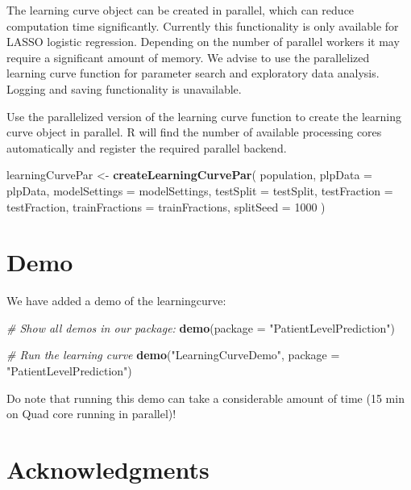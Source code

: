 \documentclass[]{article}
\newenvironment{Shaded}{\begin{snugshade}}{\end{snugshade}}
\newcommand{\KeywordTok}[1]{\textcolor[rgb]{0.13,0.29,0.53}{\textbf{#1}}}
\newcommand{\DataTypeTok}[1]{\textcolor[rgb]{0.13,0.29,0.53}{#1}}
\newcommand{\DecValTok}[1]{\textcolor[rgb]{0.00,0.00,0.81}{#1}}
\newcommand{\StringTok}[1]{\textcolor[rgb]{0.31,0.60,0.02}{#1}}
\newcommand{\CommentTok}[1]{\textcolor[rgb]{0.56,0.35,0.01}{\textit{#1}}}
\newcommand{\NormalTok}[1]{#1}
\begin{document}
The learning curve object can be created in parallel, which can reduce
computation time significantly. Currently this functionality is only
available for LASSO logistic regression. Depending on the number of
parallel workers it may require a significant amount of memory. We
advise to use the parallelized learning curve function for parameter
search and exploratory data analysis. Logging and saving functionality
is unavailable.

Use the parallelized version of the learning curve function to create
the learning curve object in parallel. R will find the number of
available processing cores automatically and register the required
parallel backend.

\begin{Shaded}
\begin{Highlighting}[]
\NormalTok{learningCurvePar <-}\StringTok{ }\KeywordTok{createLearningCurvePar}\NormalTok{(}
\NormalTok{  population,}
  \DataTypeTok{plpData =}\NormalTok{  plpData,}
  \DataTypeTok{modelSettings =}\NormalTok{ modelSettings,}
  \DataTypeTok{testSplit =}\NormalTok{ testSplit,}
  \DataTypeTok{testFraction =}\NormalTok{ testFraction,}
  \DataTypeTok{trainFractions =}\NormalTok{ trainFractions,}
  \DataTypeTok{splitSeed =} \DecValTok{1000}
\NormalTok{)}
\end{Highlighting}
\end{Shaded}

\section{Demo}\label{demo}

We have added a demo of the learningcurve:

\begin{Shaded}
\begin{Highlighting}[]
\CommentTok{# Show all demos in our package: }
 \KeywordTok{demo}\NormalTok{(}\DataTypeTok{package =} \StringTok{"PatientLevelPrediction"}\NormalTok{)}

\CommentTok{# Run the learning curve}
 \KeywordTok{demo}\NormalTok{(}\StringTok{"LearningCurveDemo"}\NormalTok{, }\DataTypeTok{package =} \StringTok{"PatientLevelPrediction"}\NormalTok{)}
\end{Highlighting}
\end{Shaded}

Do note that running this demo can take a considerable amount of time
(15 min on Quad core running in parallel)!

\section{Acknowledgments}\label{acknowledgments}
\end{document}
